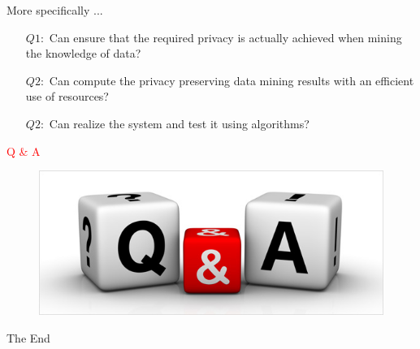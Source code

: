 \documentclass{beamer} %
\newcommand{\red}[1]{\textcolor{red}{#1}}
\begin{document}


\begin{frame}
More specifically ...
\begin{itemize} \itemsep2pt \parskip0pt 
    \item[$Q1:$] Can ensure that the required privacy is actually achieved when mining the knowledge of data?
    \item[$Q2:$] Can compute the privacy preserving data mining results with an efficient use of resources?
    \item[$Q2:$] Can realize the system and test it using algorithms?
\end{itemize}
\end{frame}







\begin{frame}
\Huge{\centerline{\red{Q \& A}}}
\begin{figure}[H]
\centering
\includegraphics[width=1\textwidth]{./QA.jpg}
\end{figure}
\end{frame}



\begin{frame}
\Huge{\centerline{The End}}
\end{frame}
\end{document}
